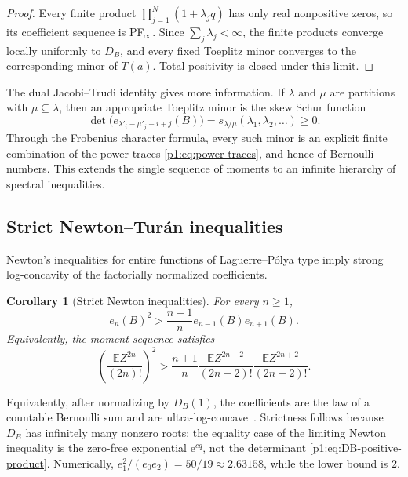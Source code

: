 \documentclass[11pt,oneside]{article}
\newtheorem{corollary}[theorem]{Corollary}
\theoremstyle{definition}
\newcommand{\e}{\mathrm e}
\newcommand{\E}{\mathbb E}
\begin{document}
\begin{proof}
Every finite product \(\prod_{j=1}^{N}(1+\lambda_jq)\) has only real nonpositive
zeros, so its coefficient sequence is PF\(_\infty\).  Since
\(\sum_j\lambda_j<\infty\), the finite products converge locally uniformly to
\(D_B\), and every fixed Toeplitz minor converges to the corresponding minor of
\(T(a)\).  Total positivity is closed under this limit.
\end{proof}

The dual Jacobi--Trudi identity gives more information.  If \(\lambda\) and \(\mu\)
are partitions with \(\mu\subseteq\lambda\), then an appropriate Toeplitz minor is the
skew Schur function
\begin{equation}
 \det\bigl(e_{\lambda'_i-\mu'_j-i+j}(B)\bigr)
 =s_{\lambda/\mu}(\lambda_1,\lambda_2,\ldots)\ge0.
 \label{p1:eq:Schur-minors}
\end{equation}
Through the Frobenius character formula, every such minor is an explicit finite
combination of the power traces \eqref{p1:eq:power-traces}, and hence of Bernoulli
numbers.  This extends the single sequence of moments to an infinite hierarchy of
spectral inequalities.

\subsection{Strict Newton--Tur\'an inequalities}

Newton's inequalities for entire functions of Laguerre--P\'olya type imply strong
log-concavity of the factorially normalized coefficients.

\begin{corollary}[Strict Newton inequalities]
\label{p1:cor:Newton}
For every \(n\ge1\),
\begin{equation}
 \boxed{\quad
 e_n(B)^2>\frac{n+1}{n}e_{n-1}(B)e_{n+1}(B).
 \quad}
 \label{p1:eq:strict-Newton}
\end{equation}
Equivalently, the moment sequence satisfies
\begin{equation}
 \left(\frac{\E Z^{2n}}{(2n)!}\right)^2
 >\frac{n+1}{n}
 \frac{\E Z^{2n-2}}{(2n-2)!}
 \frac{\E Z^{2n+2}}{(2n+2)!}.
 \label{p1:eq:moment-Turan}
\end{equation}
\end{corollary}

Equivalently, after normalizing by \(D_B(1)\), the coefficients are the law of a
countable Bernoulli sum and are ultra-log-concave~\cite{p1:Liggett1997}.
Strictness follows because \(D_B\) has infinitely many nonzero roots; the equality
case of the limiting Newton inequality is the zero-free exponential
\(\e^{cq}\), not the determinant \eqref{p1:eq:DB-positive-product}.  Numerically,
\(e_1^2/(e_0e_2)=50/19\approx2.63158\), while the lower bound is \(2\).
\end{document}
